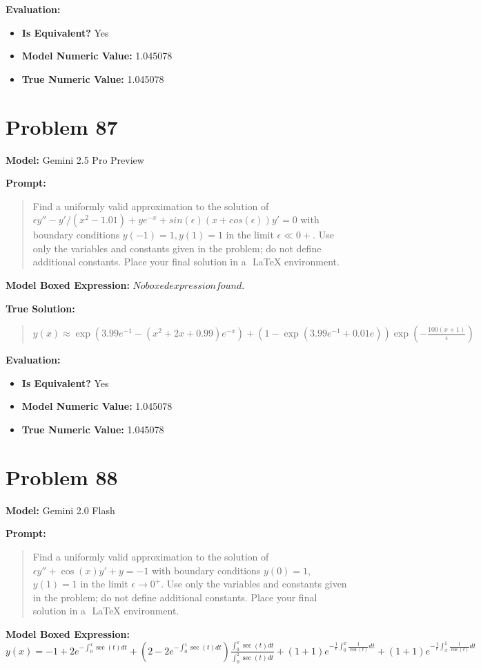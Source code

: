 \documentclass{article}
\begin{document}
{\textbf{Evaluation:}
\begin{itemize}
\item \textbf{Is Equivalent?} Yes
\item \textbf{Model Numeric Value:} 1.045078
\item \textbf{True Numeric Value:} 1.045078
\end{itemize}
\vspace{1cm}
\section*{Problem 87}
\textbf{Model:} Gemini 2.5 Pro Preview

\textbf{Prompt:}
\begin{quote}
Find a uniformly valid approximation to the solution of $\epsilon y'' - y'/(x^2-1.01) + ye^{-x} + sin(\epsilon)(x+cos(\epsilon)) y' = 0$ with boundary conditions $y(-1) = 1, y(1) = 1$ in the limit $\epsilon \ll 0+$. Use only the variables and constants given in the problem; do not define additional constants. Place your final solution in a $\boxed{}$ LaTeX environment.
\end{quote}
\textbf{Model Boxed Expression:} $No boxed expression found.$

\textbf{True Solution:}
\begin{quote}
$y(x) \approx \exp(3.99 e^{-1} - (x^2 + 2x + 0.99) e^{-x}) + \left(1 - \exp(3.99 e^{-1} + 0.01 e)\right) \exp\left(-\frac{100(x+1)}{\epsilon}\right)$
\end{quote}

\textbf{Evaluation:}
\begin{itemize}
\item \textbf{Is Equivalent?} Yes
\item \textbf{Model Numeric Value:} 1.045078
\item \textbf{True Numeric Value:} 1.045078
\end{itemize}
\vspace{1cm}
\section*{Problem 88}
\textbf{Model:} Gemini 2.0 Flash

\textbf{Prompt:}
\begin{quote}
Find a uniformly valid approximation to the solution of $\epsilon y'' + \cos(x)y' + y = -1$ with boundary conditions $y(0) = 1$, $y(1) = 1$ in the limit $\epsilon \rightarrow 0^+$. Use only the variables and constants given in the problem; do not define additional constants. Place your final solution in a $\boxed{}$ LaTeX environment.
\end{quote}
\textbf{Model Boxed Expression:} $y(x) = -1 + 2e^{-\int_0^x \sec(t) dt} + (2 - 2e^{-\int_0^1 \sec(t) dt})\frac{\int_0^x \sec(t) dt}{\int_0^1 \sec(t) dt} + (1+1)e^{-\frac{1}{\epsilon}\int_0^x \frac{1}{\cos(t)}dt} + (1+1)e^{-\frac{1}{\epsilon}\int_x^1 \frac{1}{\cos(t)}dt}$

}
\end{document}
